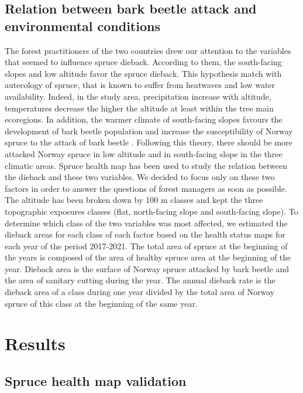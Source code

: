 \documentclass[3p,procedia]{elsarticle}
\begin{document}
\subsection{Relation between bark beetle attack and environmental conditions}

The forest practitioners of the two countries drew our attention to the variables that seemed to influence spruce dieback. 
According to them, the south-facing slopes and low altitude favor the spruce dieback.
This hypothesis match with autecology of spruce, that is known to suffer from heatwaves and low water availability. 
Indeed, in the study area, precipitation increase with altitude, temperatures decrease the higher the altitude at least within the tree main ecoregions.
In addition, the warmer climate of south-facing slopes favours the development of bark beetle population \citep{annila_influence_1969, baier_phenipscomprehensive_2007, jonsson_2009, marini_climate_2012} and increase the susceptibility of Norway spruce to the attack of bark beetle \citep{wermelinger_ecology_2004, netherer_waterlimiting_2015}.
Following this theory, there should be more attacked Norway spruce in low altitude and in south-facing slope in the three climatic areas.  
Spruce health map has been used to study the relation between the dieback and these two variables.
We decided to focus only on these two factors in order to answer the questions of forest managers as soon as possible.
The altitude has been broken down  by 100 m classes and kept the three topographic exposures classes (flat, north-facing slope and south-facing slope).
To determine which class of the two variables was most affected, we estimated the dieback areas for each class of each factor based on the health status maps for each year of the period 2017-2021.
The total area of spruce at the beginning of the years is composed of the area of healthy spruce area at the beginning of the year.
Dieback area is the surface of Norway spruce attacked by bark beetle and the area of sanitary cutting during the year.  
The  annual dieback rate is  the dieback area of a class during one year divided by the total area of Norway spruce of this class at the beginning of the same year. 


\section{Results}


\subsection{Spruce health map validation}
\end{document}
